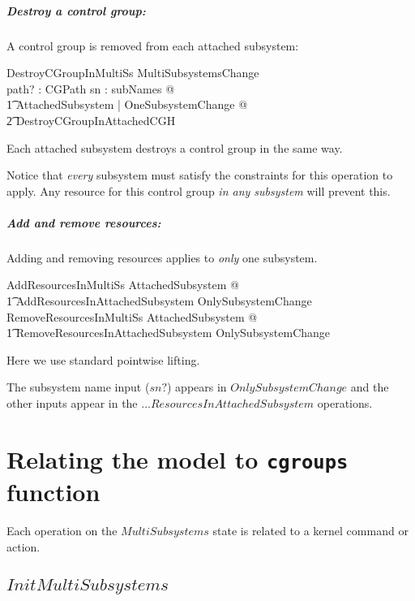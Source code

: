 \documentclass[a4paper,twoside,12pt]{article}
\begin{document}
\subparagraph{Destroy a control group:}

A control group is removed from each attached subsystem:

\begin{schema}{DestroyCGroupInMultiSs}
MultiSubsystemsChange \\
path? : CGPath
\where
\forall sn : subNames @ \\
\t1 \exists \Delta AttachedSubsystem | OneSubsystemChange @ \\
    \t2 DestroyCGroupInAttachedCGH
\end{schema}
Each attached subsystem destroys a control group in the same way.

Notice that \emph{every} subsystem must satisfy the constraints for this operation to apply.
Any resource for this control group \emph{in any subsystem} will prevent this.

\subparagraph{Add and remove resources:}

Adding and removing resources applies to \emph{only} one subsystem.

\begin{zed}
AddResourcesInMultiSs   \exists \Delta AttachedSubsystem @ \\
    \t1 AddResourcesInAttachedSubsystem \land OnlySubsystemChange
\also
RemoveResourcesInMultiSs   \exists \Delta AttachedSubsystem @ \\
    \t1 RemoveResourcesInAttachedSubsystem \land OnlySubsystemChange
\end{zed}
Here we use standard pointwise lifting.

The subsystem name input ($sn?$) appears in $OnlySubsystemChange$
and the other inputs appear in the ...$ResourcesInAttachedSubsystem$ operations.

\section{Relating the model to \texttt{cgroups} function}
\label{sec:kernel}

Each operation on the $MultiSubsystems$ state is related to a kernel command or action. 

\subsection{$InitMultiSubsystems$}
\end{document}
